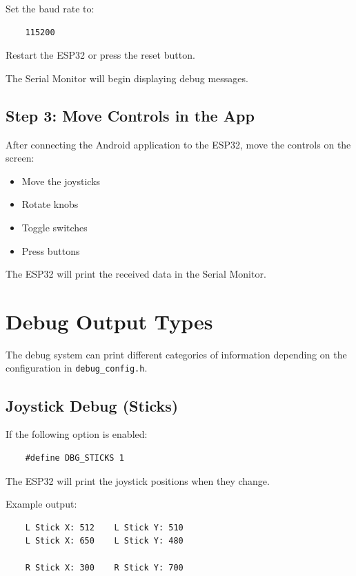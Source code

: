 Set the baud rate to:

\begin{verbatim}
	115200
\end{verbatim}

Restart the ESP32 or press the reset button.

The Serial Monitor will begin displaying debug messages.

\subsection{Step 3: Move Controls in the App}

After connecting the Android application to the ESP32, move the controls on the screen:

\begin{itemize}
	\item Move the joysticks
	\item Rotate knobs
	\item Toggle switches
	\item Press buttons
\end{itemize}

The ESP32 will print the received data in the Serial Monitor.

\section{Debug Output Types}

The debug system can print different categories of information depending on the configuration in \texttt{debug\_config.h}.

\subsection{Joystick Debug (Sticks)}

If the following option is enabled:

\begin{verbatim}
	#define DBG_STICKS 1
\end{verbatim}

The ESP32 will print the joystick positions when they change.

Example output:

\begin{verbatim}
	L Stick X: 512    L Stick Y: 510
	L Stick X: 650    L Stick Y: 480

	R Stick X: 300    R Stick Y: 700
\end{verbatim}

